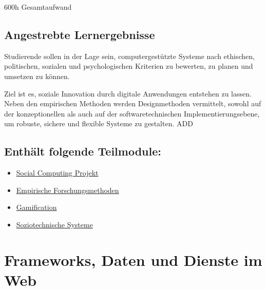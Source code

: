 600h Gesamtaufwand

\hypertarget{angestrebte-lernergebnissepathlabelmi-2017modulbeschreibungen-bachelorba_vertiefung_socialcomputing}{%
\section*{Angestrebte
Lernergebnisse\label{/mi-2017/modulbeschreibungen-bachelor/BA_Vertiefung_SocialComputing}}\label{angestrebte-lernergebnissepathlabelmi-2017modulbeschreibungen-bachelorba_vertiefung_socialcomputing}}

Studierende sollen in der Lage sein, computergestützte Systeme nach
ethischen, politischen, sozialen und psychologischen Kriterien zu
bewerten, zu planen und umsetzen zu können.

Ziel ist es, soziale Innovation durch digitale Anwendungen entstehen zu
lassen. Neben den empirischen Methoden werden Designmethoden vermittelt,
sowohl auf der konzeptionellen als auch auf der softwaretechnischen
Implementierungsebene, um robuste, sichere und flexible Systeme zu
gestalten. ADD

\hypertarget{enthuxe4lt-folgende-teilmodulepathlabelmi-2017modulbeschreibungen-bachelorba_vertiefung_socialcomputing}{%
\section*{Enthält folgende
Teilmodule:\label{/mi-2017/modulbeschreibungen-bachelor/BA_Vertiefung_SocialComputing}}\label{enthuxe4lt-folgende-teilmodulepathlabelmi-2017modulbeschreibungen-bachelorba_vertiefung_socialcomputing}}

\begin{itemize}
\tightlist
\item
  \hyperref[/mi-2017/modulbeschreibungen-bachelor/BA_SC_Projekt]{Social Computing Projekt}
\item
  \hyperref[/mi-2017/modulbeschreibungen-bachelor/BA_SC_empirische-forschungsmethoden]{Empirische Forschungsmethoden}
\item
  \hyperref[/mi-2017/modulbeschreibungen-bachelor/BA_SC_gamification]{Gamification}
\item
  \hyperref[/mi-2017/modulbeschreibungen-bachelor/BA_SC_soziotechnische-systeme]{Soziotechnische Systeme}
\end{itemize}

\hypertarget{frameworks-daten-und-dienste-im-webpathlabelmi-2017modulbeschreibungen-bachelorba_wd_frameworks-daten-und-dienste}{%
\chapter{Frameworks, Daten und Dienste im
Web\label{/mi-2017/modulbeschreibungen-bachelor/BA_WD_Frameworks-daten-und-dienste}}\label{frameworks-daten-und-dienste-im-webpathlabelmi-2017modulbeschreibungen-bachelorba_wd_frameworks-daten-und-dienste}}

